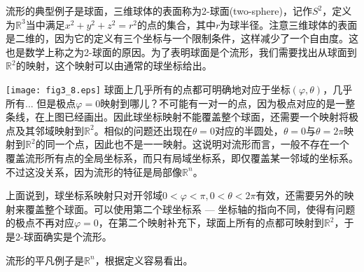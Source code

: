 流形的典型例子是球面，三维球体的表面称为2-球面(two-sphere)，记作$S^2$，定义为$\mathbb{R}^3$当中满足$x^2 + y^2 + z^2 = r^2$的点的集合，其中$r$为球半径。注意三维球体的表面是二维的，因为它的定义有三个坐标与一个限制条件，这样减少了一个自由度。这也是数学上称之为2-球面的原因。为了表明球面是个流形，我们需要找出从球面到$\mathbb{R}^2$的映射，这个映射可以由通常的球坐标给出。

{
\centering
    \texttt{[image: fig3\_8.eps]}
}
球面上几乎所有的点都可明确地对应于坐标$(\varphi, \theta)$，几乎所有... 但是极点$\varphi = 0$映射到哪儿？不可能有一对一的点，因为极点对应的是一整条线，在上图已经画出。因此球坐标映射不能覆盖整个球面，还需要一个映射将极点及其邻域映射到$\mathbb{R}^2$。相似的问题还出现在$\theta = 0$对应的半圆处，$\theta = 0$与$\theta = 2\pi$映射到$\mathbb{R}^2$的同一个点，因此也不是一一映射。这说明对流形而言，一般不存在一个覆盖流形所有点的全局坐标系，而只有局域坐标系，即仅覆盖某一邻域的坐标系。不过这没关系，因为流形的特征是局部像$\mathbb{R}^n$。

上面说到，球坐标系映射只对开邻域$0 < \varphi < \pi, 0 < \theta < 2\pi$有效，还需要另外的映射来覆盖整个球面。可以使用第二个球坐标系 --- 坐标轴的指向不同，使得有问题的极点不再对应$\varphi = 0$，在第二个映射补充下，球面上所有的点都可映射到$\mathbb{R}^2$，于是2-球面确实是个流形。

流形的平凡例子是$\mathbb{R}^n$，根据定义容易看出。